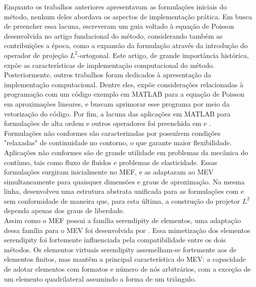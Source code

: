 \indent Enquanto os trabalhos anteriores apresentavam as formulações iniciais do método, nenhum deles abordava os aspectos de implementação prática. Em busca de preencher essa lacuna, \citet{hitchhikersguidevirtualelementmethod2014a} escreveram um guia voltado à equação de Poisson desenvolvida no artigo fundacional do método, considerando também as contribuições a época, como a expansão da formulação através da introdução do operador de projeção $L^2$-ortogonal. Este artigo, de grande importância histórica, expõe as características de implementação computacional do método. Posteriormente, outros trabalhos foram dedicados à apresentação da implementação computacional. Dentre eles, \citet{virtualelementmethod50linesmatlab2017} expõe considerações relacionadas à programação com um código exemplo em MATLAB para a equação de Poisson em aproximações lineares, e \citet{chen2020programming} buscam aprimorar esse programa por meio da vetorização do código. Por fim, a lacuna das aplicações em MATLAB para formulações de alta ordem e outros operadores foi preenchida em \citet{numericalimplementationhighorder2dvirtualelementmethodmatlab2023a} e \citet{mvemmatlabsoftwarepackagevirtualelementmethods2022}. \\
\indent Formulações não conformes são caracterizadas por possuírem condições "relaxadas" de continuidade no contorno, o que garante maior flexibilidade. Aplicações não conformes são de grande utilidade em problemas da mecânica do contínuo, tais como fluxo de fluidos e problemas de elasticidade. Essas formulações surgiram inicialmente no MEF, e \citet{nonconformingvirtualelementmethod2016} as adaptaram ao MEV simultaneamente para quaisquer dimensões e graus de aproximação. Na mesma linha, \citet{conformingnonconformingvirtualelementmethodsellipticproblems2016a} desenvolveu uma estrutura abstrata unificada para as formulações com e sem conformidade de maneira que, para esta última, a construção do projetor $L^2$ dependa apenas dos graus de liberdade. \\
\indent Assim como o MEF possui a família serendipity de elementos, uma adaptação dessa família para o MEV foi desenvolvida por \citet{serendipitynodalvemspaces2016}. Essa mimetização dos elementos serendipity foi fortemente influenciada pela compatibilidade entre os dois métodos. Os elementos virtuais serendipity assemelham-se fortemente aos de elementos finitos, mas mantêm a principal característica do MEV: a capacidade de adotar elementos com formatos e número de nós arbitrários, com a exceção de um elemento quadrilateral assumindo a forma de um triângulo. \\

